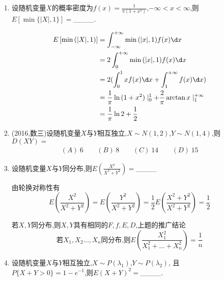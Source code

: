 \documentclass[12pt, a4paper, oneside, UTF8]{ctexbook}
\begin{document}
\begin{enumerate}[label=\arabic*.]
    \item 设随机变量$X$的概率密度为$f(x)=\frac{1}{\pi(1+x^2)}$,$-\infty<x<\infty$,则$E[\min\{|X|,1\}]=$\_\_\_\_.
    
    \begin{solution}
    \begin{align*}
        E\left[\min{(|X|, 1)}\right] &= \int_{-\infty}^{+\infty}\min{(|x|,1)}f(x)\d x \\
        &=2\int_{0}^{+\infty}\min{(|x|,1)}f(x)\d x\\
        &=2(\int_{0}^{1}xf(x)\d x + \int_{1}^{+\infty}f(x)\d x) \\
        &=\frac{1}{\pi}\ln{(1+x^2)}\mid^{1}_0+\frac{2}{\pi}\arctan{x}\mid^{+\infty}_{1} \\
        &=\frac{1}{\pi}\ln{2}+\frac{1}{2}
    \end{align*}
    \end{solution}
    
    \item (2016,数三)设随机变量$X$与$Y$相互独立,$X\sim N(1,2)$,$Y\sim N(1,4)$,则$D(XY)=$
    \begin{align*}
        (A)\ 6 \qquad (B)\ 8 \qquad (C)\ 14 \qquad (D)\ 15
    \end{align*}
    
    
    \item 设随机变量$X$与$Y$同分布,则$E\left(\frac{X^2}{X^2+Y^2}\right)=$\_\_\_\_
    
    \begin{solution}
    由轮换对称性有
    $$E\left(\frac{X^2}{X^2+Y^2}\right)=E\left(\frac{Y^2}{X^2+Y^2}\right)
    =\frac{1}{2}E\left(\frac{X^2+Y^2}{X^2+Y^2}\right)=\frac{1}{2}$$
    \end{solution}
    \begin{tcolorbox}[title=总结]
        若$X,Y$同分布,则$X,Y$具有相同的$F,f,E,D$,上题的推广结论 
        \[
        \text{若}X_1,X_2\ldots,X_n\text{同分布,则}E\left(\frac{X_1^2}{X_1^2+\ldots+X_n^2}\right)=\frac{1}{n}
        \]
    \end{tcolorbox}
    \item 设随机变量$X$与$Y$相互独立,$X\sim P(\lambda_1)$,$Y\sim P(\lambda_2)$,
    且$P\{X+Y>0\}=1-e^{-1}$,则$E(X+Y)^2=$\_\_\_\_.
    

\end{enumerate}
\end{document}
